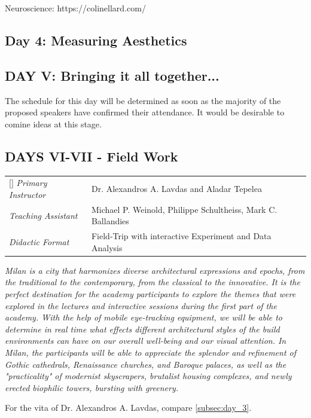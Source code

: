 \documentclass{article}
\begin{document}
Neuroscience: https://colinellard.com/




\subsection{Day 4: Measuring Aesthetics}

\subsection{DAY V: Bringing it all together...}

The schedule for this day will be determined as soon as the majority of the proposed speakers have confirmed their attendance. It would be desirable to comine ideas at this stage.

\clearpage
\subsection{DAYS VI-VII - Field Work}

\begin{NiceTabular}{W{l}{3cm}l}[]
\textit{Primary Instructor} & Dr. Alexandros A. Lavdas and Aladar Tepelea \\
\textit{Teaching Assistant} & Michael P. Weinold, Philippe Schultheiss, Mark C. Ballandies \\
\textit{Didactic Format} & Field-Trip with interactive Experiment and Data Analysis
\end{NiceTabular}

\textit{Milan is a city that harmonizes diverse architectural expressions and epochs, from the traditional to the contemporary, from the classical to the innovative. It is the perfect destination for the academy participants to explore the themes that were explored in the lectures and interactive sessions during the first part of the academy. With the help of mobile eye-tracking equipment, we will be able to determine in real time what effects different architectural styles of the build environments can have on our overall well-being and our visual attention. In Milan, the participants will be able to appreciate the splendor and refinement of Gothic cathedrals, Renaissance churches, and Baroque palaces, as well as the "practicality" of modernist skyscrapers, brutalist housing complexes, and newly erected biophilic towers, bursting with greenery. }

For the vita of Dr. Alexandros A. Lavdas, compare \cref{subsec:day_3}.
\end{document}
